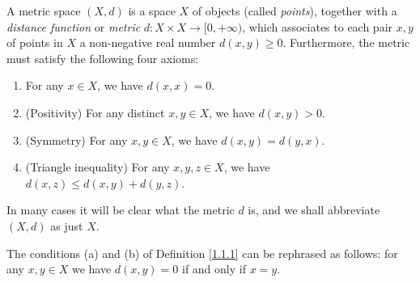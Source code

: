 \begin{definition}\label{1.1.2}
    A metric space \((X, d)\) is a space \(X\) of objects (called \emph{points}), together with a \emph{distance function} or \emph{metric} \(d : X \times X \to [0, +\infty)\), which associates to each pair \(x, y\) of points in \(X\) a non-negative real number \(d(x, y) \geq 0\).
    Furthermore, the metric must satisfy the following four axioms:
    \begin{enumerate}
        \item For any \(x \in X\), we have \(d(x, x) = 0\).
        \item (Positivity) For any distinct \(x, y \in X\), we have \(d(x, y) > 0\).
        \item (Symmetry) For any \(x, y \in X\), we have \(d(x, y) = d(y, x)\).
        \item (Triangle inequality) For any \(x, y, z \in X\), we have \(d(x, z) \leq d(x, y) + d(y, z)\).
    \end{enumerate}
\end{definition}

\begin{note}
    In many cases it will be clear what the metric \(d\) is, and we shall abbreviate \((X, d)\) as just \(X\).
\end{note}

\begin{remark}\label{1.1.3}
    The conditions (a) and (b) of Definition \ref{1.1.1} can be rephrased as follows:
    for any \(x, y \in X\) we have \(d(x, y) = 0\) if and only if \(x = y\).
\end{remark}